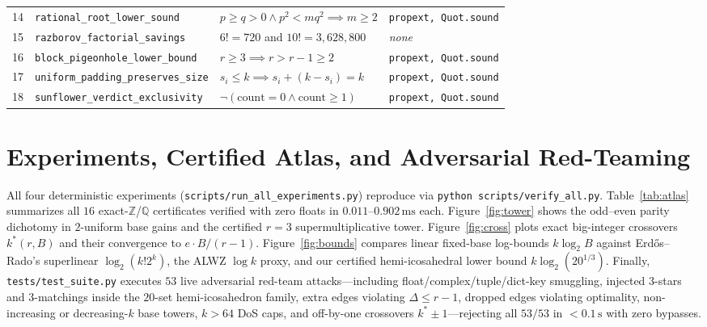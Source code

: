 \documentclass[11pt,a4paper]{article}
\theoremstyle{definition}
\theoremstyle{remark}
\newcommand{\QQ}{\mathbb{Q}}
\newcommand{\ZZ}{\mathbb{Z}}
\begin{document}
\begin{table}[t]
\begin{tabular}{@{}clll@{}}
14 & \texttt{rational\_root\_lower\_sound} & $p \ge q > 0 \wedge p^2 < m q^2 \implies m \ge 2$ & \texttt{propext, Quot.sound} \\
15 & \texttt{razborov\_factorial\_savings} & $6! = 720$ and $10! = 3{,}628{,}800$ & \emph{none} \\
16 & \texttt{block\_pigeonhole\_lower\_bound} & $r \ge 3 \implies r > r-1 \ge 2$ & \texttt{propext, Quot.sound} \\
17 & \texttt{uniform\_padding\_preserves\_size} & $s_i \le k \implies s_i + (k - s_i) = k$ & \texttt{propext, Quot.sound} \\
18 & \texttt{sunflower\_verdict\_exclusivity} & $\neg(\text{count} = 0 \wedge \text{count} \ge 1)$ & \texttt{propext, Quot.sound} \\
\bottomrule
\end{tabular}
\end{table}

\section{Experiments, Certified Atlas, and Adversarial Red-Teaming}\label{sec:experiments}

All four deterministic experiments (\texttt{scripts/run\_all\_experiments.py}) reproduce via \texttt{python scripts/verify\_all.py}. Table~\ref{tab:atlas} summarizes all $16$ exact-$\ZZ$/$\QQ$ certificates verified with zero floats in $0.011$--$0.902\,\mathrm{ms}$ each. Figure~\ref{fig:tower} shows the odd--even parity dichotomy in $2$-uniform base gains and the certified $r=3$ supermultiplicative tower. Figure~\ref{fig:cross} plots exact big-integer crossovers $k^*(r, B)$ and their convergence to $e \cdot B/(r-1)$. Figure~\ref{fig:bounds} compares linear fixed-base log-bounds $k\log_2 B$ against Erd\H{o}s--Rado's superlinear $\log_2(k!2^k)$, the ALWZ $\log k$ proxy, and our certified hemi-icosahedral lower bound $k\log_2(20^{1/3})$. Finally, \texttt{tests/test\_suite.py} executes $53$ live adversarial red-team attacks---including float/complex/tuple/dict-key smuggling, injected $3$-stars and $3$-matchings inside the $20$-set hemi-icosahedron family, extra edges violating $\Delta \le r-1$, dropped edges violating optimality, non-increasing or decreasing-$k$ base towers, $k > 64$ DoS caps, and off-by-one crossovers $k^* \pm 1$---rejecting all $53/53$ in $< 0.1\,\mathrm{s}$ with zero bypasses.
\end{document}

